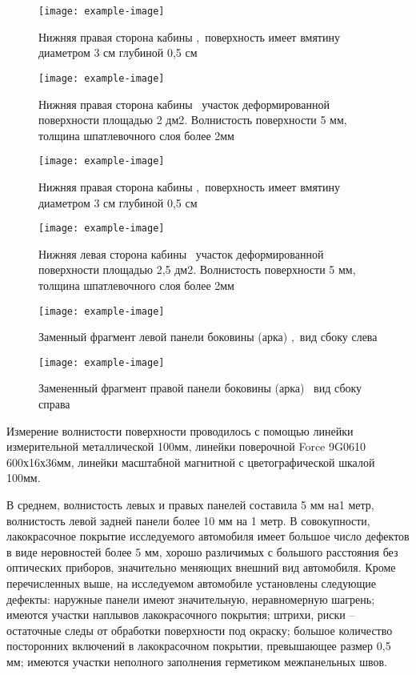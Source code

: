 {   \begin{figure}[H]\centering
	\parbox[t]{0.49\textwidth}
	{\centering
		\texttt{[image: example-image]}
		\caption{\footnotesize {Нижняя правая сторона кабины ,\, поверхность имеет вмятину диаметром 3 см глубиной 0,5 см}}
		\label{кабинаснизусправа}}
	\hfil \hfil
	\parbox[t]{0.49\textwidth}
	{\centering
		\texttt{[image: example-image]}
		\caption{\footnotesize {Нижняя правая сторона кабины \tc\, участок деформированной поверхности площадью 2 дм2. Волнистость поверхности 5 мм, толщина шпатлевочного слоя более 2мм}}
		\label{кабинаволнистость}}
\end{figure}


\begin{figure}[H]\centering
	\parbox[t]{0.49\textwidth}
	{\centering
		\texttt{[image: example-image]}
		\caption{\footnotesize {Нижняя правая сторона кабины ,\, поверхность имеет вмятину диаметром 3 см глубиной 0,5 см}}
		\label{панелвлп}}
	\hfil \hfil
	\parbox[t]{0.49\textwidth}
	{\centering
		\texttt{[image: example-image]}
		\caption{\footnotesize {Нижняя левая сторона кабины \tc\, участок деформированной поверхности площадью 2,5 дм2. Волнистость поверхности 5 мм, толщина шпатлевочного слоя более 2мм}}
		\label{панельвл}}
\end{figure}



   \begin{figure}[H]\centering
	\parbox[t]{0.49\textwidth}
	{\centering
		\texttt{[image: example-image]}
		\caption{\footnotesize {Заменный фрагмент левой панели боковины (арка) ,\, вид сбоку слева}}
		\label{аркасправа}}
	\hfil \hfil
	\parbox[t]{0.49\textwidth}
	{\centering
		\texttt{[image: example-image]}
		\caption{\footnotesize {Замененный фрагмент правой панели боковины (арка) \tc\, вид сбоку справа}}
		\label{аркаслева}}
\end{figure}
   
%   
   
    Измерение волнистости поверхности проводилось с помощью линейки измерительной    металлической 100мм, линейки поверочной Force 9G0610 600х16х36мм, линейки    масштабной магнитной с цветографической шкалой 100мм.
   
   
   В среднем, волнистость левых и правых панелей составила 5 мм на1 метр, волнистость
   левой задней панели более 10 мм на 1 метр.
   В совокупности, лакокрасочное покрытие исследуемого автомобиля имеет большое
   число дефектов в виде неровностей более 5 мм, хорошо различимых с большого расстояния без оптических
   приборов, значительно меняющих внешний вид автомобиля.
   Кроме  перечисленных выше, на исследуемом автомобиле установлены
   следующие дефекты: наружные панели имеют значительную, неравномерную шагрень;
   имеются участки наплывов лакокрасочного покрытия; штрихи, риски – остаточные следы от
   обработки поверхности под окраску; большое количество посторонних включений в
   лакокрасочном покрытии, превышающее размер 0,5 мм; имеются участки неполного
   заполнения герметиком межпанельных швов. 
   
}

